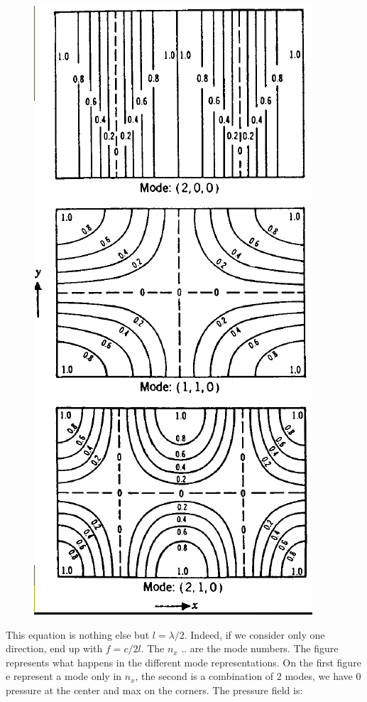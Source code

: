 	 \begin{figure}
	\vspace{-5mm}
	\includegraphics[scale=0.2]{acoustics/ch4/8}
	\label{fig:4.8}
	\end{figure}
	This equation is nothing else but $l = \lambda /2$. Indeed, if we consider only one direction, end up with $f = c/2l$. The $n_x$ .. are the mode numbers. The figure represents what happens in the different mode representations. On the first figure e represent a mode only in $n_x$, the second is a combination of 2 modes, we have 0 pressure at the center and max on the corners. The pressure field is:
	
